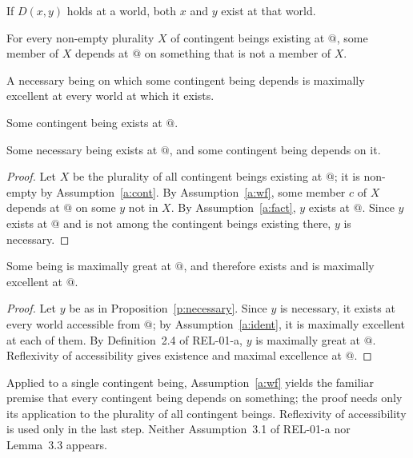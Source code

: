\documentclass{situationist-preprint}
\begin{document}
\begin{assumption}[Factivity]\label{a:fact}
If $D(x,y)$ holds at a world, both $x$ and $y$ exist at that world.
\end{assumption}

\begin{assumption}\label{a:wf}
For every non-empty plurality $X$ of contingent beings existing at $@$, some member of $X$ depends at $@$ on something that is not a member of $X$.
\end{assumption}

\begin{assumption}[Identification]\label{a:ident}
A necessary being on which some contingent being depends is maximally excellent at every world at which it exists.
\end{assumption}

\begin{assumption}[Contingency]\label{a:cont}
Some contingent being exists at $@$.
\end{assumption}

\begin{proposition}\label{p:necessary}
Some necessary being exists at $@$, and some contingent being depends on it.
\end{proposition}

\begin{proof}
Let $X$ be the plurality of all contingent beings existing at $@$; it is non-empty by Assumption~\ref{a:cont}. By Assumption~\ref{a:wf}, some member $c$ of $X$ depends at $@$ on some $y$ not in $X$. By Assumption~\ref{a:fact}, $y$ exists at $@$. Since $y$ exists at $@$ and is not among the contingent beings existing there, $y$ is necessary.
\end{proof}

\begin{theorem}\label{t:main}
Some being is maximally great at $@$, and therefore exists and is maximally excellent at $@$.
\end{theorem}

\begin{proof}
Let $y$ be as in Proposition~\ref{p:necessary}. Since $y$ is necessary, it exists at every world accessible from $@$; by Assumption~\ref{a:ident}, it is maximally excellent at each of them. By Definition~2.4 of REL-01-a, $y$ is maximally great at $@$. Reflexivity of accessibility gives existence and maximal excellence at $@$.
\end{proof}

Applied to a single contingent being, Assumption~\ref{a:wf} yields the familiar premise that every contingent being depends on something; the proof needs only its application to the plurality of all contingent beings. Reflexivity of accessibility is used only in the last step. Neither Assumption~3.1 of REL-01-a nor Lemma~3.3 appears.
\end{document}
